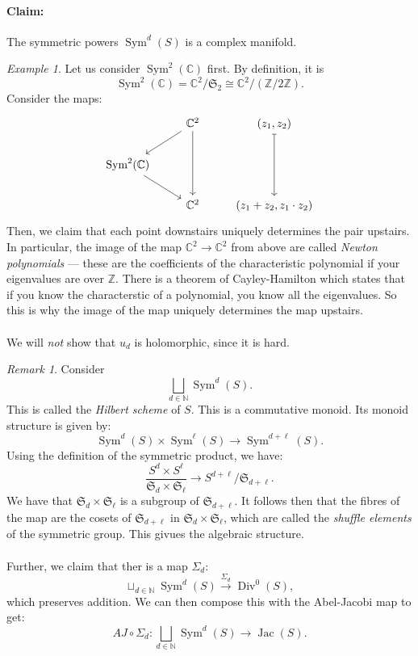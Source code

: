 \documentclass[a4paper]{report}
\theoremstyle{definition}
\theoremstyle{remark}
\newtheorem{remark}{Remark}
\theoremstyle{proposition}
\theoremstyle{conjecture}
\theoremstyle{lemma}
\theoremstyle{corollary}
\theoremstyle{exercise}
\theoremstyle{example}
\newtheorem{example}{Example}
\newcommand{\C}{\mathbb{C}}
\newcommand{\on}{\operatorname}
\begin{document}
\paragraph{Claim:} The symmetric powers $\on{Sym}^d(S)$ is a complex manifold.

\begin{example}
    Let us consider $\on{Sym}^2(\C)$ first. By definition, it is 
    $$\on{Sym}^2(\C) = \C^2/\mathfrak{S}_2 \cong \C^2/(\mathbb{Z}/2\mathbb{Z}).$$
    Consider the maps:
    $$\begin{tikzcd}
                          & \C^2 \arrow[ld] \arrow[dd] & {(z_1,z_2)} \arrow[dd, maps to] \\
\on{Sym}^2(\C) \arrow[rd] &                            &                                 \\
                          & \C^2                       & {(z_1+z_2, z_1\cdot z_2)}      
\end{tikzcd}$$
    Then, we claim that each point downstairs uniquely determines the pair
    upstairs.
    In particular, the image of the map $\C^2 \to \C^2$ from above
    are called \emph{Newton polynomials} --- these are the coefficients
    of the characteristic polynomial if your eigenvalues are over 
    $\mathbb{Z}$. There is a theorem of Cayley-Hamilton which states that if 
    you know the characterstic of a polynomial, you know all the eigenvalues. So
    this is why the image of the map uniquely determines the map 
    upstairs.\\\\
    We will \emph{not} show that $u_d$ is holomorphic, since it is hard. 
\end{example}

\begin{remark}
    Consider 
    $$\bigsqcup_{d\in\mathbb{N}} \on{Sym}^d(S).$$
    This is called the \emph{Hilbert scheme} of $S$. This is a 
    commutative monoid. Its monoid structure is given by:
    $$\on{Sym}^d(S) \times \on{Sym}^\ell(S) \longrightarrow \on{Sym}^{d+\ell}(S).$$
    Using the definition of the symmetric product, we have:
    $$\frac{S^d\times S^\ell}{\mathfrak{S}_d\times \mathfrak{S}_\ell}\longrightarrow S^{d+\ell}/\mathfrak{S}_{d+\ell}.$$
    We have that $\mathfrak{S}_d\times \mathfrak{S}_\ell$ is a subgroup of
    $\mathfrak{S}_{d+\ell}$. It follows then that the fibres of the 
    map are the cosets of $\mathfrak{S}_{d+\ell}$ in 
    $\mathfrak{S}_d\times\mathfrak{S}_\ell$, which are called the 
    \emph{shuffle elements} of the symmetric group. This givues the 
    algebraic structure.\\\\
    Further, we claim that ther is a map $\Sigma_d$:
    $$\sqcup_{d\in\mathbb{N}} \on{Sym}^d(S) \stackrel{\Sigma_d}{\longrightarrow} \on{Div}^0(S),$$
    which preserves addition. We can then compose this with the Abel-Jacobi
    map to get:
    $$AJ \circ \Sigma_d : \bigsqcup_{d\in\mathbb{N}} \on{Sym}^d(S)\longrightarrow \on{Jac}(S).$$
\end{remark}
\end{document}
